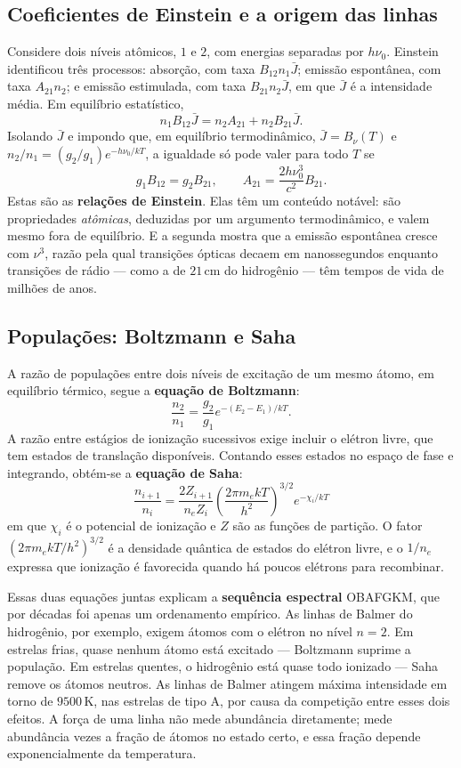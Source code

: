 \documentclass[11pt,a4paper]{article}
\begin{document}
\subsection*{Coeficientes de Einstein e a origem das linhas}

Considere dois níveis atômicos, $1$ e $2$, com energias separadas por $h\nu_0$. Einstein identificou três processos: absorção, com taxa $B_{12}n_1\bar{J}$; emissão espontânea, com taxa $A_{21}n_2$; e emissão estimulada, com taxa $B_{21}n_2\bar{J}$, em que $\bar{J}$ é a intensidade média. Em equilíbrio estatístico,
\[
n_1B_{12}\bar{J}=n_2A_{21}+n_2B_{21}\bar{J}.
\]
Isolando $\bar{J}$ e impondo que, em equilíbrio termodinâmico, $\bar{J}=B_\nu(T)$ e $n_2/n_1=(g_2/g_1)e^{-h\nu_0/kT}$, a igualdade só pode valer para todo $T$ se
\[
g_1B_{12}=g_2B_{21},\qquad
A_{21}=\frac{2h\nu_0^{3}}{c^{2}}B_{21}.
\]
Estas são as \textbf{relações de Einstein}. Elas têm um conteúdo notável: são propriedades \emph{atômicas}, deduzidas por um argumento termodinâmico, e valem mesmo fora de equilíbrio. E a segunda mostra que a emissão espontânea cresce com $\nu^{3}$, razão pela qual transições ópticas decaem em nanossegundos enquanto transições de rádio --- como a de $21\,\mathrm{cm}$ do hidrogênio --- têm tempos de vida de milhões de anos.

\subsection*{Populações: Boltzmann e Saha}

A razão de populações entre dois níveis de excitação de um mesmo átomo, em equilíbrio térmico, segue a \textbf{equação de Boltzmann}:
\[
\frac{n_2}{n_1}=\frac{g_2}{g_1}e^{-(E_2-E_1)/kT}.
\]
A razão entre estágios de ionização sucessivos exige incluir o elétron livre, que tem estados de translação disponíveis. Contando esses estados no espaço de fase e integrando, obtém-se a \textbf{equação de Saha}:
\[
\boxed{\ \frac{n_{i+1}}{n_i}=\frac{2Z_{i+1}}{n_eZ_i}\left(\frac{2\pi m_ekT}{h^{2}}\right)^{3/2}e^{-\chi_i/kT}\ }
\]
em que $\chi_i$ é o potencial de ionização e $Z$ são as funções de partição. O fator $(2\pi m_ekT/h^{2})^{3/2}$ é a densidade quântica de estados do elétron livre, e o $1/n_e$ expressa que ionização é favorecida quando há poucos elétrons para recombinar.

Essas duas equações juntas explicam a \textbf{sequência espectral} OBAFGKM, que por décadas foi apenas um ordenamento empírico. As linhas de Balmer do hidrogênio, por exemplo, exigem átomos com o elétron no nível $n=2$. Em estrelas frias, quase nenhum átomo está excitado --- Boltzmann suprime a população. Em estrelas quentes, o hidrogênio está quase todo ionizado --- Saha remove os átomos neutros. As linhas de Balmer atingem máxima intensidade em torno de $9500\,\mathrm{K}$, nas estrelas de tipo A, por causa da competição entre esses dois efeitos. A força de uma linha não mede abundância diretamente; mede abundância vezes a fração de átomos no estado certo, e essa fração depende exponencialmente da temperatura.
\end{document}
